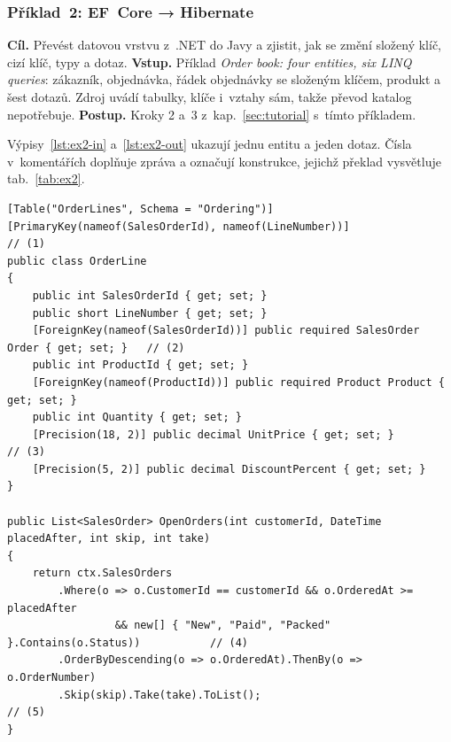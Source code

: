 \subsubsection*{Příklad~2: EF~Core → Hibernate}

\textbf{Cíl.} Převést datovou vrstvu z~.NET do Javy a zjistit, jak se změní složený klíč, cizí klíč, typy a dotaz. \textbf{Vstup.} Příklad \emph{Order book: four entities, six LINQ queries}: zákazník, objednávka, řádek objednávky se složeným klíčem, produkt a šest dotazů. Zdroj uvádí tabulky, klíče i~vztahy sám, takže převod katalog nepotřebuje. \textbf{Postup.} Kroky 2 a~3 z~kap.~\ref{sec:tutorial} s~tímto příkladem.

Výpisy~\ref{lst:ex2-in} a~\ref{lst:ex2-out} ukazují jednu entitu a jeden dotaz. Čísla v~komentářích doplňuje zpráva a označují konstrukce, jejichž překlad vysvětluje tab.~\ref{tab:ex2}.

\noindent\begin{minipage}{\linewidth}
\begin{lstlisting}[language={[Sharp]C},caption={Příklad~2, vstup (výběr): \texttt{OrderLine.cs} a \texttt{OpenOrders.cs}.},label={lst:ex2-in}]
[Table("OrderLines", Schema = "Ordering")]
[PrimaryKey(nameof(SalesOrderId), nameof(LineNumber))]                              // (1)
public class OrderLine
{
    public int SalesOrderId { get; set; }
    public short LineNumber { get; set; }
    [ForeignKey(nameof(SalesOrderId))] public required SalesOrder Order { get; set; }   // (2)
    public int ProductId { get; set; }
    [ForeignKey(nameof(ProductId))] public required Product Product { get; set; }
    public int Quantity { get; set; }
    [Precision(18, 2)] public decimal UnitPrice { get; set; }                       // (3)
    [Precision(5, 2)] public decimal DiscountPercent { get; set; }
}

public List<SalesOrder> OpenOrders(int customerId, DateTime placedAfter, int skip, int take)
{
    return ctx.SalesOrders
        .Where(o => o.CustomerId == customerId && o.OrderedAt >= placedAfter
                 && new[] { "New", "Paid", "Packed" }.Contains(o.Status))           // (4)
        .OrderByDescending(o => o.OrderedAt).ThenBy(o => o.OrderNumber)
        .Skip(skip).Take(take).ToList();                                            // (5)
}
\end{lstlisting}
\end{minipage}

